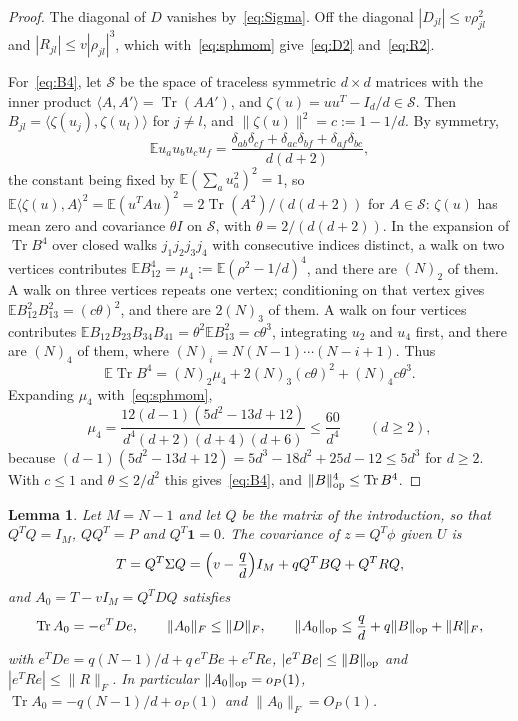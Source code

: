 \documentclass[11pt]{amsart}
\newtheorem{lemma}[theorem]{Lemma}
\theoremstyle{remark}
\numberwithin{equation}{section}
\newcommand{\EE}{\mathbb{E}}
\DeclareMathOperator{\Tr}{Tr}
\begin{document}
\begin{proof}
The diagonal of $D$ vanishes by~\eqref{eq:Sigma}. Off the diagonal $|D_{jl}|\le v\rho_{jl}^2$ and $|R_{jl}|\le v|\rho_{jl}|^3$, which with~\eqref{eq:sphmom} give~\eqref{eq:D2} and~\eqref{eq:R2}.

For~\eqref{eq:B4}, let $\mathcal S$ be the space of traceless symmetric $d\times d$ matrices with the inner product $\langle A,A'\rangle=\Tr(AA')$, and $\zeta(u)=uu^{T}-I_d/d\in\mathcal S$. Then $B_{jl}=\langle\zeta(u_j),\zeta(u_l)\rangle$ for $j\ne l$, and $\|\zeta(u)\|^2=c:=1-1/d$. By symmetry,
\[
\EE u_au_bu_cu_f=\frac{\delta_{ab}\delta_{cf}+\delta_{ac}\delta_{bf}+\delta_{af}\delta_{bc}}{d(d+2)},
\]
the constant being fixed by $\EE(\sum_au_a^2)^2=1$, so $\EE\langle\zeta(u),A\rangle^2=\EE(u^{T}Au)^2=2\Tr(A^2)/(d(d+2))$ for $A\in\mathcal S$: $\zeta(u)$ has mean zero and covariance $\theta I$ on $\mathcal S$, with $\theta=2/(d(d+2))$. In the expansion of $\Tr B^4$ over closed walks $j_1j_2j_3j_4$ with consecutive indices distinct, a walk on two vertices contributes $\EE B_{12}^4=\mu_4:=\EE(\rho^2-1/d)^4$, and there are $(N)_2$ of them. A walk on three vertices repeats one vertex; conditioning on that vertex gives $\EE B_{12}^2B_{13}^2=(c\theta)^2$, and there are $2(N)_3$ of them. A walk on four vertices contributes $\EE B_{12}B_{23}B_{34}B_{41}=\theta^2\EE B_{13}^2=c\theta^3$, integrating $u_2$ and $u_4$ first, and there are $(N)_4$ of them, where $(N)_i=N(N-1)\cdots(N-i+1)$. Thus
\[
\EE\Tr B^4=(N)_2\mu_4+2(N)_3(c\theta)^2+(N)_4c\theta^3.
\]
Expanding $\mu_4$ with~\eqref{eq:sphmom},
\[
\mu_4=\frac{12(d-1)(5d^2-13d+12)}{d^4(d+2)(d+4)(d+6)}\le\frac{60}{d^4}\qquad(d\ge2),
\]
because $(d-1)(5d^2-13d+12)=5d^3-18d^2+25d-12\le5d^3$ for $d\ge2$. With $c\le1$ and $\theta\le2/d^2$ this gives~\eqref{eq:B4}, and $\|B\|_{\rm op}^4\le\Tr B^4$.
\end{proof}

\begin{lemma}\label{lem:T}
Let $M=N-1$ and let $Q$ be the matrix of the introduction, so that $Q^{T}Q=I_M$, $QQ^{T}=P$ and $Q^{T}\mathbf 1=0$. The covariance of $z=Q^{T}\phi$ given $U$ is
\begin{equation}\label{eq:T}
T=Q^{T}\Sigma Q=\Bigl(v-\frac qd\Bigr)I_M+qQ^{T}BQ+Q^{T}RQ,
\end{equation}
and $A_0=T-vI_M=Q^{T}DQ$ satisfies
\begin{equation}\label{eq:A0}
\Tr A_0=-e^{T}De,\qquad\|A_0\|_F\le\|D\|_F,\qquad\|A_0\|_{\rm op}\le\frac qd+q\|B\|_{\rm op}+\|R\|_F,
\end{equation}
with $e^{T}De=q(N-1)/d+q\,e^{T}Be+e^{T}Re$, $|e^{T}Be|\le\|B\|_{\rm op}$ and $|e^{T}Re|\le\|R\|_F$. In particular $\|A_0\|_{\rm op}=o_P(1)$, $\Tr A_0=-q(N-1)/d+o_P(1)$ and $\|A_0\|_F=O_P(1)$.
\end{lemma}
\end{document}

